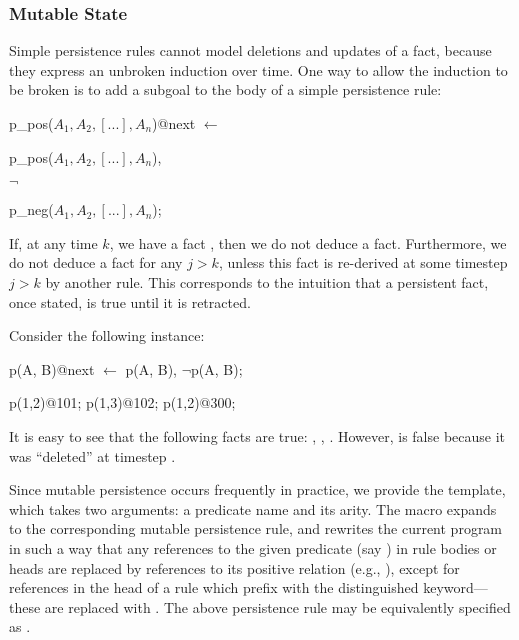 \subsubsection{Mutable State}
\label{sec:mutable}

Simple persistence rules cannot model deletions and updates of a fact, because
they express an unbroken induction over time.  One way to allow the induction
to be broken is to add a  subgoal to the body of a simple
persistence rule:

\begin{dedalus}
p\_pos($A_1,A_2,[...],A_n$)@next $\leftarrow$
\end{dedalus}

\hspace{5mm}
\begin{dedalus}
p\_pos($A_1,A_2,[...],A_n$),
\end{dedalus}

\hspace{5mm}
$\lnot$
\begin{dedalus}
p\_neg($A_1,A_2,[...],A_n$);
\end{dedalus}

\noindent If, at any time $k$, we have a fact
, then we do not deduce a
 fact.  Furthermore, we do not deduce a
 fact for any $j > k$, unless this
 fact is re-derived at some timestep $j > k$ by another rule.
This corresponds to the intuition that a persistent fact, once stated, is true
until it is retracted.

\begin{example}
Consider the following \lang instance:

\begin{Dedalus}
p\pos(A, B)@next \(\leftarrow\) p\pos(A, B), \(\lnot\)p\nega(A, B);

p(1,2)@101;
p(1,3)@102;
p\nega(1,2)@300;
\end{Dedalus}

It is easy to see that the following facts are true: ,
, .  However,  is
false because it was ``deleted'' at timestep .
\end{example}

Since mutable persistence occurs frequently in practice, we provide the
 template, which takes two arguments: a predicate name and
its arity.  The macro expands to the corresponding mutable persistence rule,
and rewrites the current program in such a way that any references to the given
predicate (say ) in rule bodies or heads are replaced by references
to its positive relation (e.g., ), except for references in the
head of a rule which prefix  with the distinguished 
keyword---these are replaced with .  The above
 persistence rule may be equivalently specified as
.

